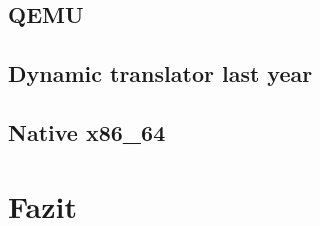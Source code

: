 \documentclass[course=eragp]{aspdoc}
\begin{document}
\subsection{QEMU}
\subsection{Dynamic translator last year}
\subsection{Native x86\_64}

\section{Fazit}


{}
\end{document}
